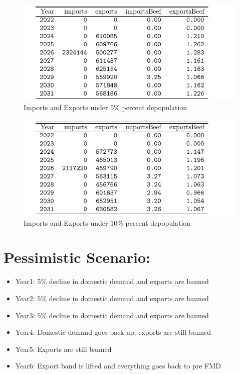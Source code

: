 \documentclass[
]{article}
\begin{document}
\begin{figure}
  \includegraphics[width=8in]{FMD-SimulationPlots/09-02/OPT_TRADE_5.pdf}
  \caption{Imports and Exports under $5\%$ percent depopulation}
\end{figure}

\begin{figure}
  \includegraphics[width=8in]{FMD-SimulationPlots/09-02/OPT_TRADE_10.pdf}
  \caption{Imports and Exports under $10\%$ percent depopulation}
\end{figure}

\clearpage

\hypertarget{pessimistic-scenario}{%
\section{\texorpdfstring{Pessimistic
Scenario:\newline}{Pessimistic Scenario:}}\label{pessimistic-scenario}}

\begin{itemize}
\item Year1: $5\%$ decline in domestic demand and exports are banned
\item Year2: $5\%$ decline in domestic demand and exports are banned
\item Year3: $5\%$ decline in domestic demand and exports are banned
\item Year4: Domestic demand goes back up, exports are still banned
\item Year5: Exports are still banned
\item Year6: Export band is lifted and everything goes back to pre FMD
\end{itemize}
\end{document}
